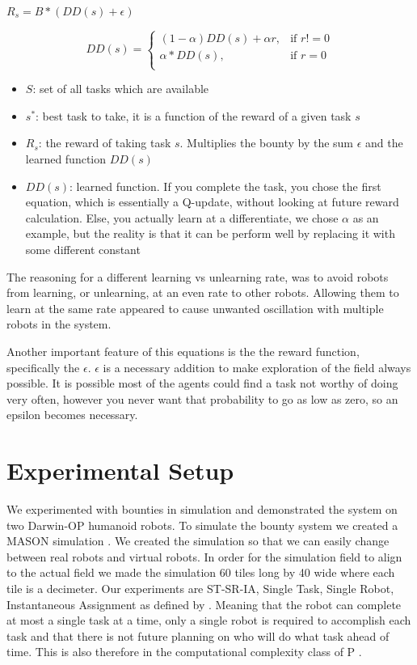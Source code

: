 \documentclass[twocolumn]{article}
\begin{document}
$R_s=B*(DD(s)+\epsilon)$

\[ DD(s) = 
\begin{cases}
     (1-\alpha)DD(s)+ \alpha r,& \text{if } r!=0\\
     \alpha*DD(s),& \text{if } r=0\\

\end{cases}
\]

\begin{itemize}
\item $S$: set of all tasks which are available
\item $s^*$:  best task to take, it is a function of the reward of a given task $s$
\item $R_s$: the reward of taking task $s$. Multiplies the bounty by the sum $\epsilon$ and the learned function $DD(s)$
\item $DD(s)$:  learned function. If you complete the task, you chose the first equation, which is essentially a Q-update, without looking at future reward calculation. Else, you actually learn at a differentiate, we chose $\alpha$ as an example, but the reality is that it can be perform well by replacing it with some different constant


\end{itemize}
The reasoning for a different learning vs unlearning rate, was to avoid robots from learning, or unlearning, at an even rate to other robots. Allowing them to learn at the same rate appeared to cause unwanted oscillation with multiple robots in the system. 

Another important feature of this equations is the the reward function, specifically the $\epsilon$. $\epsilon$ is a necessary addition to make exploration of the field always possible. It is possible most of the agents could find a task not worthy of doing very often, however you never want that probability to go as low as zero, so an epsilon becomes necessary.
\section{Experimental Setup}

We experimented with bounties in simulation and demonstrated the system on two Darwin-OP humanoid robots.  To simulate the bounty system we created a MASON simulation \cite{Luke2003}.  We created the simulation so that we can easily change between real robots and virtual robots.  In order for the simulation field to align to the actual field we made the simulation 60 tiles long by 40 wide where each tile is a decimeter.  Our experiments are ST-SR-IA, Single Task, Single Robot, Instantaneous Assignment as defined by \cite{Gerkey2004}.  Meaning that the robot can complete at most a single task at a time, only a single robot is required to accomplish each task and that there is not future planning on who will do what task ahead of time.  This is also therefore in the computational complexity class of P \cite{Campbell2010, Gerkey2003}.
\end{document}
